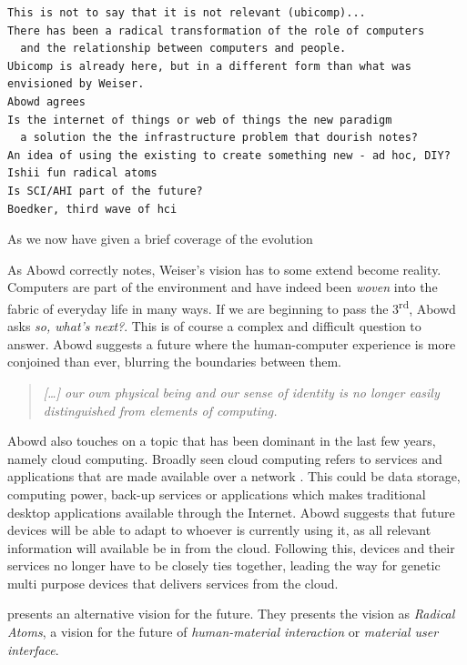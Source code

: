 \begin{verbatim}
This is not to say that it is not relevant (ubicomp)...
There has been a radical transformation of the role of computers
  and the relationship between computers and people.
Ubicomp is already here, but in a different form than what was envisioned by Weiser.
Abowd agrees
Is the internet of things or web of things the new paradigm
  a solution the the infrastructure problem that dourish notes?
An idea of using the existing to create something new - ad hoc, DIY?
Ishii fun radical atoms
Is SCI/AHI part of the future?
Boedker, third wave of hci
\end{verbatim}

As we now have given a brief coverage of the evolution

As Abowd correctly notes, Weiser's vision has to some extend become reality. 
Computers are part of the environment and have indeed been \textit{woven} into the fabric of everyday life in many ways.  
If we are beginning to pass the 3\textsuperscript{rd}, Abowd asks \textit{so, what's next?}.
This is of course a complex and difficult question to answer.
Abowd suggests a future where the human-computer experience is more conjoined than ever, blurring the boundaries between them.
\begin{quote}
\emph{[\ldots] our own physical being and our sense of identity is no longer easily distinguished from elements of computing.}
\end{quote}
Abowd also touches on a topic that has been dominant in the last few years, namely cloud computing.
Broadly seen cloud computing refers to services and applications that are made available over a network .
This could be data storage, computing power, back-up services or applications which makes traditional desktop applications available through the Internet.
Abowd suggests that future devices will be able to adapt to whoever is currently using it, as all relevant information will available be in from the cloud.
Following this, devices and their services no longer have to be closely ties together, leading the way for genetic multi purpose devices that delivers services from the cloud.

\citet{ishii2012radical} presents an alternative vision for the future.
They presents the vision as \textit{Radical Atoms}, a vision for the future of \textit{human-material interaction} or \textit{material user interface}. 

